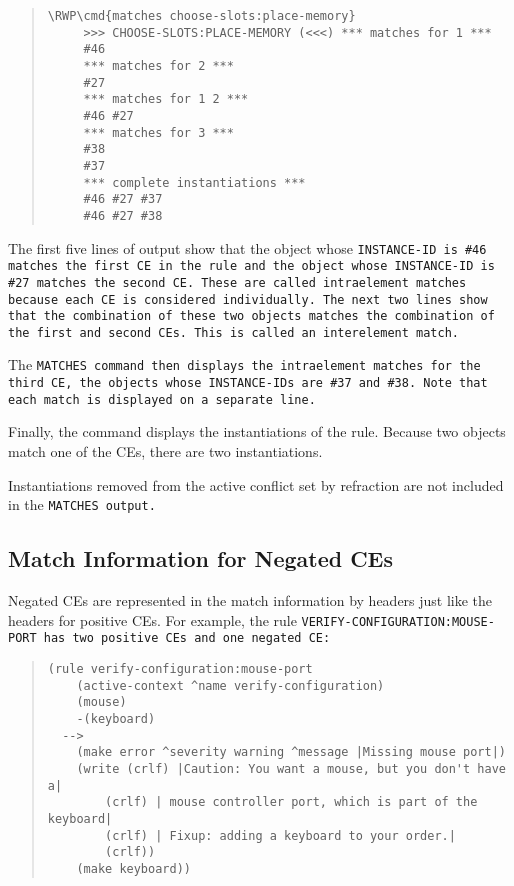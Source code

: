 \begin{quote}
\begin{Verbatim}[commandchars=\\\{\}]
\RWP\cmd{matches choose-slots:place-memory}
     >>> CHOOSE-SLOTS:PLACE-MEMORY (<<<) *** matches for 1 ***
     #46
     *** matches for 2 ***
     #27
     *** matches for 1 2 ***
     #46 #27
     *** matches for 3 ***
     #38
     #37
     *** complete instantiations ***
     #46 #27 #37
     #46 #27 #38
\end{Verbatim}
\end{quote}

The first five lines of output show that the object whose
\tt{INSTANCE-ID} is \verb|#46| matches the first CE in the rule and
the object whose \tt{INSTANCE-ID} is \verb|#27| matches the second
CE. These are called intraelement matches because each CE is
considered individually. The next two lines show that the combination
of these two objects matches the combination of the first and second
CEs. This is called an interelement match.

The \tt{MATCHES} command then displays the intraelement matches for
the third CE, the objects whose \tt{INSTANCE-ID}s are \verb|#37| and
\verb|#38|.  Note that each match is displayed on a separate line.

Finally, the command displays the instantiations of the rule.  Because
two objects match one of the CEs, there are two instantiations.

Instantiations removed from the active conflict set by refraction are
not included in the \tt{MATCHES} output.

\subsection{Match Information for Negated CEs}

Negated CEs are represented in the match information by headers just
like the headers for positive CEs. For example, the rule
\tt{VERIFY-CONFIGURATION:MOUSE-PORT} has two positive CEs and one
negated CE:

\begin{quote}
\begin{verbatim}
(rule verify-configuration:mouse-port
    (active-context ^name verify-configuration)
    (mouse)
    -(keyboard)
  -->
    (make error ^severity warning ^message |Missing mouse port|)
    (write (crlf) |Caution: You want a mouse, but you don't have a|
        (crlf) | mouse controller port, which is part of the keyboard|
        (crlf) | Fixup: adding a keyboard to your order.|
        (crlf))
    (make keyboard))
\end{verbatim}
\end{quote}

